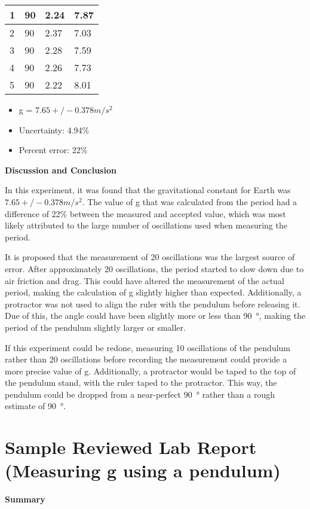 \begin{table}
\begin{tabular}{|l|l|l|l|}
\hline
1 & 90 & 2.24 & 7.87 \\ \hline
2 & 90 & 2.37 & 7.03 \\ \hline
3 & 90 & 2.28 & 7.59 \\ \hline
4 & 90 & 2.26 & 7.73 \\ \hline
5 & 90 & 2.22 & 8.01 \\ \hline
\end{tabular}
\end{table}

\begin{itemize}
\item g = $\SI{7.65}+/- {0.378}{m/s^2}$
\item Uncertainty: 4.94\%
\item Percent error: 22\%
\end{itemize}

\textbf{Discussion and Conclusion}

In this experiment, it was found that the gravitational constant for Earth was $\SI{7.65}+/- {0.378}{m/s^2}$. The value of g that was calculated from the period had a difference of 22\% between the measured and accepted value, which was most likely attributed to the large number of oscillations used when measuring the period.

It is proposed that the measurement of 20 oscillations was the largest source of error. After approximately 20 oscillations, the period started to slow down due to air friction and drag. This could have altered the measurement of the actual period, making the calculation of g slightly higher than expected. Additionally, a protractor was not used to align the ruler with the pendulum before releasing it. Due of this, the angle could have been slightly more or less than \SI{90}{\degree}, making the period of the pendulum slightly larger or smaller. 

If this experiment could be redone, measuring 10 oscillations of the pendulum rather than 20 oscillations before recording the measurement could provide a more precise value of g. Additionally, a protractor would be taped to the top of the pendulum stand, with the ruler taped to the protractor. This way, the pendulum could be dropped from a near-perfect \SI{90}{\degree} rather than a rough estimate of \SI{90}{\degree}. 

 \vspace{0.25cm}
\section{Sample Reviewed Lab Report (Measuring g using a pendulum)}
 \vspace{0.25cm}
\textbf{Summary}

